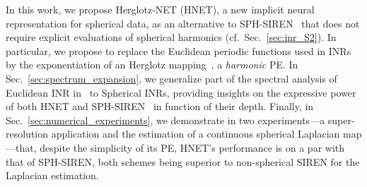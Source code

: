 \documentclass[conference]{IEEEtran}
\begin{document}
In this work, we propose Herglotz-NET (HNET), a new implicit neural representation for spherical data, as an alternative to SPH-SIREN~\cite{russwurm2024locationencoding} that does not require explicit evaluations of spherical harmonics (cf.~Sec.~\ref{sec:inr_S2}). 
In particular, we propose to replace the Euclidean periodic functions used in INRs by the exponentiation of an Herglotz mapping~\cite[Sec. VII.7]{courant62}, a \emph{harmonic} PE.
In Sec.~\ref{sec:spectrum_expansion}, we generalize part of the spectral analysis of Euclidean INR  in~\cite{yuce2022structureddictionaryperspectiveimplicit} to Spherical INRs, providing insights on the expressive power of both HNET and SPH-SIREN~\cite{russwurm2024locationencoding} in function of their depth. 
Finally, in Sec.~\ref{sec:numerical_experiments}, we demonstrate in two experiments---a super-resolution application and the estimation of a continuous spherical Laplacian map---that, despite the simplicity of its PE, HNET's performance is on a par with that of SPH-SIREN, both schemes being superior to non-spherical SIREN for the Laplacian estimation. 
\end{document}
